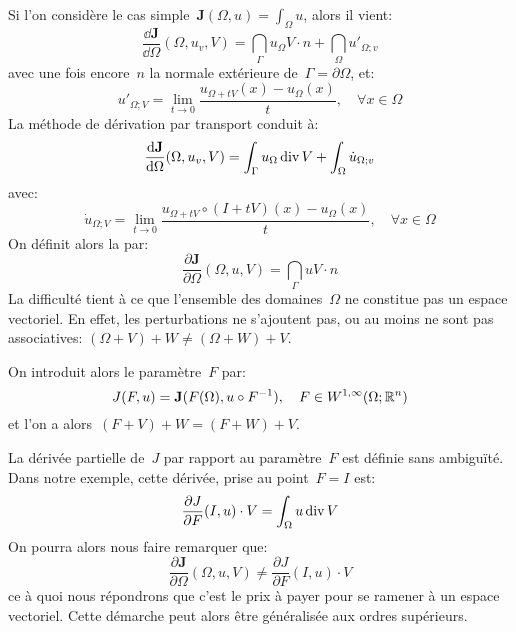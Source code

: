 \medskip
Si l'on considère le cas simple~${\mathbf J}(\Omega,u)=\int_\Omega u$, alors il vient:
\begin{equation}
\dfrac{\dd{\mathbf J}}{\dd\Omega}(\Omega, u_v,V)=\dint_\Gamma u_\Omega V\cdot n + \dint_\Omega u'_{\Omega;v}
\end{equation}
avec une fois encore~$n$ la normale extérieure de~$\Gamma=\partial\Omega$, et:
\begin{equation}
u'_{\Omega;V}=\lim_{t\rightarrow0} \dfrac{u_{\Omega+tV}(x)-u_\Omega(x)}t, \quad\forall x\in\Omega
\end{equation}
La méthode de dérivation par transport conduit à:
\begin{equation}
\dfrac{\text{d}{\mathbf J}}{\text{d}\Omega}(\Omega, u_v,V)=\displaystyle\int_\Gamma u_\Omega \operatorname{div} V + \displaystyle\int_\Omega \dot{u}_{\Omega;v}
\end{equation}
avec:
\begin{equation}
\dot{u}_{\Omega;V}=\lim_{t\rightarrow0} \dfrac{u_{\Omega+tV}\circ (I+tV)(x)-u_\Omega(x)}t,\quad \forall x\in\Omega
\end{equation}
On définit alors la 
par:
\begin{equation}
\dfrac{\partial{\mathbf J}}{\partial\Omega}(\Omega, u,V) = \dint_\Gamma u V\cdot n
\end{equation}
La difficulté tient à ce que l'ensemble des domaines~$\Omega$ ne constitue pas un espace vectoriel. En effet, les perturbations ne s'ajoutent pas, ou au moins ne sont pas associatives:
$(\Omega+V)+W\ne(\Omega+W)+V$.

\medskip
{} On introduit alors le paramètre~$F$ par:
\begin{equation}
J(F,u)={\mathbf J}(F(\Omega),u\circ F^{-1}),\quad F\in W^{1,\infty}(\Omega;\mathbb R^n)
\end{equation}
et l'on a alors~$(F+V)+W=(F+W)+V$.

La dérivée partielle de~$J$ par rapport au paramètre~$F$ est définie sans ambiguïté. Dans notre exemple, cette dérivée, prise au point~$F=I$ est:
\begin{equation}
\dfrac{\partial J}{\partial F}(I,u)\cdot V = \displaystyle\int_\Omega u \operatorname{div} V
\end{equation}
On pourra alors nous faire remarquer que:
\begin{equation}
\dfrac{\partial{\mathbf J}}{\partial\Omega}(\Omega, u,V)
\ne
\dfrac{\partial J}{\partial F}(I,u)\cdot V
\end{equation}
ce à quoi nous répondrons que c'est le prix à payer pour se ramener à un espace vectoriel. Cette démarche peut alors être généralisée aux ordres supérieurs.

